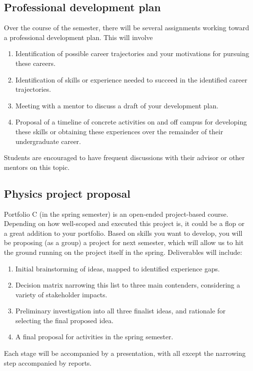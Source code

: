 \documentclass{syllabus}
\begin{document}
\subsection{Professional development plan} Over the course of the semester, there will be several assignments working toward a professional development plan. This will involve
\begin{enumerate}
    \item Identification of possible career trajectories and your motivations for pursuing these careers.
    \item Identification of skills or experience needed to succeed in the identified career trajectories.
    \item Meeting with a mentor to discuss a draft of your development plan.
    \item Proposal of a timeline of concrete activities on and off campus for developing these skills or obtaining these experiences over the remainder of their undergraduate career.
\end{enumerate}
Students are encouraged to have frequent discussions with their advisor or other mentors on this topic.



\subsection{Physics project proposal}
Portfolio C (in the spring semester) is an open-ended project-based course. Depending on how well-scoped and executed this project is, it could be a flop or a great addition to your portfolio. Based on skills you want to develop, you will be proposing (as a group) a project for next semester, which will allow us to hit the ground running on the project itself in the spring. Deliverables will include:
\begin{enumerate}
    \item Initial brainstorming of ideas, mapped to identified experience gaps.
    \item Decision matrix narrowing this list to three main contenders, considering a variety of stakeholder impacts.
    \item Preliminary investigation into all three finalist ideas, and rationale for selecting the final proposed idea.
    \item A final proposal for activities in the spring semester.
\end{enumerate}
Each stage will be accompanied by a presentation, with all except the narrowing step accompanied by reports.
\end{document}
